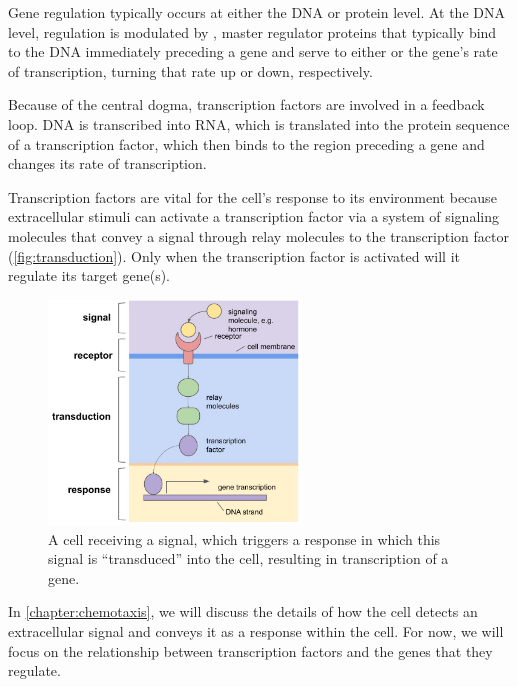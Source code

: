 Gene regulation typically occurs at either the DNA or protein level. At the DNA level, regulation is modulated by , master regulator proteins that typically bind to the DNA immediately preceding a gene and serve to either  or  the gene's rate of transcription, turning that rate up or down, respectively.

Because of the central dogma, transcription factors are involved in a feedback loop. DNA is transcribed into RNA, which is translated into the protein sequence of a transcription factor, which then binds to the region preceding a gene and changes its rate of transcription.

Transcription factors are vital for the cell's response to its environment because extracellular stimuli can activate a transcription factor via a system of signaling molecules that convey a signal through relay molecules to the transcription factor (\autoref{fig:transduction}). Only when the transcription factor is activated will it regulate its target gene(s).\\

\begin{figure}[h]
\centering
\mySfFamily
\includegraphics[width = 0.6\textwidth]{../images/signal_pathway.jpg}
\caption{A cell receiving a signal, which triggers a response in which this signal is ``transduced'' into the cell, resulting in transcription of a gene.}
\label{fig:transduction}
\end{figure}

In \autoref{chapter:chemotaxis}, we will discuss the details of how the cell detects an extracellular signal and conveys it as a response within the cell. For now, we will focus on the relationship between transcription factors and the genes that they regulate.

